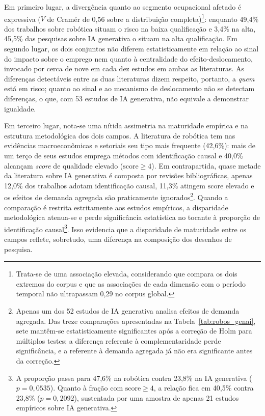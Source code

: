 Em primeiro lugar, a divergência quanto ao segmento ocupacional afetado é expressiva ($V$ de Cramér de 0,56 sobre a distribuição completa)\footnote{Trata-se de uma associação elevada, considerando que compara os dois extremos do corpus e que as associações de cada dimensão com o período temporal não ultrapassam 0,29 no corpus global.}: enquanto 49,4\% dos trabalhos sobre robótica situam o risco na baixa qualificação e 3,4\% na alta, 45,5\% das pesquisas sobre IA generativa o situam na alta qualificação. Em segundo lugar, os dois conjuntos não diferem estatisticamente em relação ao sinal do impacto sobre o emprego nem quanto à centralidade do efeito-deslocamento, invocado por cerca de nove em cada dez estudos em ambas as literaturas. As diferenças detectáveis entre as duas literaturas dizem respeito, portanto, a \emph{quem} está em risco; quanto ao sinal e ao mecanismo de deslocamento não se detectam diferenças, o que, com 53 estudos de IA generativa, não equivale a demonstrar igualdade. 

Em terceiro lugar, nota-se uma nítida assimetria na maturidade empírica e na estrutura metodológica dos dois campos. A literatura de robótica tem nas evidências macroeconômicas e setoriais seu tipo mais frequente (42,6\%): mais de um terço de seus estudos emprega métodos com identificação causal e 40,0\% alcançam \textit{score} de qualidade elevado ($\text{score} \ge 4$). Em contrapartida, quase metade da literatura sobre IA generativa é composta por revisões bibliográficas, apenas 12,0\% dos trabalhos adotam identificação causal, 11,3\% atingem $\text{score}$ elevado e os efeitos de demanda agregada são praticamente ignorados\footnote{Apenas um dos 52 estudos de IA generativa analisa efeitos de demanda agregada. Das treze comparações apresentadas na Tabela~\ref{tab:robos_genai}, sete mantêm-se estatisticamente significantes após a correção de Holm para múltiplos testes; a diferença referente à complementaridade perde significância, e a referente à demanda agregada já não era significante antes da correção.}. Quando a comparação é restrita estritamente aos estudos empíricos, a disparidade metodológica atenua-se e perde significância estatística no tocante à proporção de identificação causal\footnote{A proporção passa para 47,6\% na robótica contra 23,8\% na IA generativa ($p = 0{,}0535$). Quanto à fração com $\text{score} \ge 4$, a relação fica em 40,5\% contra 23,8\% ($p = 0{,}2092$), sustentada por uma amostra de apenas 21 estudos empíricos sobre IA generativa.}. Isso evidencia que a disparidade de maturidade entre os campos reflete, sobretudo, uma diferença na composição dos desenhos de pesquisa.

